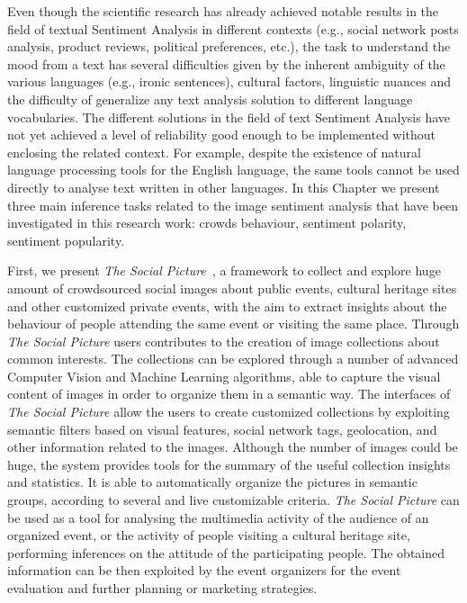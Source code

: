 Even though the scientific research has already achieved notable results in the field of textual Sentiment Analysis in different contexts (e.g., social network posts analysis, product reviews, political preferences, etc.), the task to understand the mood from a text has several difficulties given by the inherent ambiguity of the various languages (e.g., ironic sentences), cultural factors, linguistic nuances and the difficulty of generalize any text analysis solution to different language vocabularies. The different solutions in the field of text Sentiment Analysis have not yet achieved a level of reliability good enough to be implemented without enclosing the related context. For example, despite the existence of natural language processing tools for the English language, the same tools cannot be used directly to analyse text written in other languages.
In this Chapter we present three main inference tasks related to the image sentiment analysis that have been investigated in this research work: crowds behaviour, sentiment polarity, sentiment popularity. 

First, we present \textit{The Social Picture}~\cite{battiato2016social}, a framework to collect and explore huge amount of crowdsourced social images about public events, cultural heritage sites and other customized private events, with the aim to extract insights about the behaviour of people attending the same event or visiting the same place. 
Through \textit{The Social Picture} users contributes to the creation of image collections about common interests. %
The collections can be explored through a number of advanced Computer Vision and Machine Learning algorithms, able to capture the visual content of images in order to organize them in a semantic way. The interfaces of \textit{The Social Picture} allow the users to create customized collections by exploiting semantic filters based on visual features, social network tags, geolocation, and other information related to the images.
Although the number of images could be huge, the system provides tools for the summary of the useful collection insights and statistics. It is able to automatically organize the pictures in semantic groups, according to several and live customizable criteria.
\textit{The Social Picture} can be used as a tool for analysing the multimedia activity of the audience of an organized event, or the activity of people visiting a cultural heritage site, performing inferences on the attitude of the participating people. The obtained information can be then exploited by the event organizers for the event evaluation and further planning or marketing strategies.

